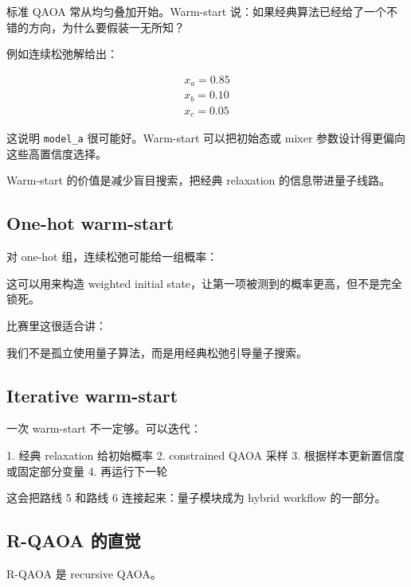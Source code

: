\documentclass[UTF8,12pt,a4paper]{ctexart}
\begin{document}
标准 QAOA 常从均匀叠加开始。Warm-start 说：如果经典算法已经给了一个不错的方向，为什么要假装一无所知？

例如连续松弛解给出：

\[
\begin{aligned}
x_{a} = 0.85\\
x_{b} = 0.10\\
x_{c} = 0.05
\end{aligned}
\]

这说明 \texttt{model\_a} 很可能好。Warm-start 可以把初始态或 mixer 参数设计得更偏向这些高置信度选择。

Warm-start 的价值是减少盲目搜索，把经典 relaxation 的信息带进量子线路。

\subsection*{One-hot warm-start}

对 one-hot 组，连续松弛可能给一组概率：

\begin{GuideVerbatim}
[0.70, 0.20, 0.10]
\end{GuideVerbatim}

这可以用来构造 weighted initial state，让第一项被测到的概率更高，但不是完全锁死。

比赛里这很适合讲：

\begin{GuideVerbatim}
我们不是孤立使用量子算法，而是用经典松弛引导量子搜索。
\end{GuideVerbatim}

\subsection*{Iterative warm-start}

一次 warm-start 不一定够。可以迭代：

\begin{GuideVerbatim}
1. 经典 relaxation 给初始概率
2. constrained QAOA 采样
3. 根据样本更新置信度或固定部分变量
4. 再运行下一轮
\end{GuideVerbatim}

这会把路线 5 和路线 6 连接起来：量子模块成为 hybrid workflow 的一部分。

\subsection*{R-QAOA 的直觉}

R-QAOA 是 recursive QAOA。
\end{document}
